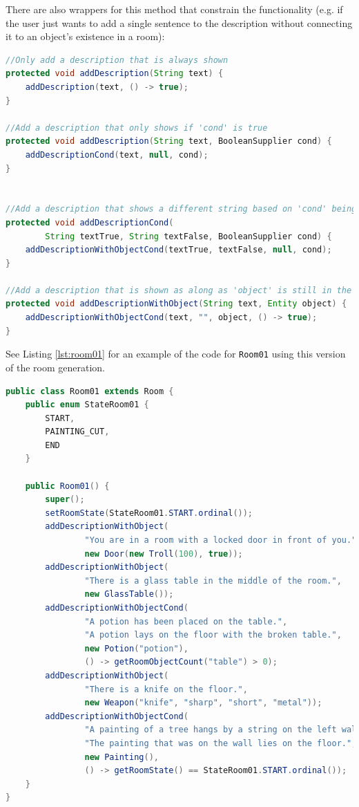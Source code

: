 \documentclass[11pt]{article}
\begin{document}
There are also wrappers for this method that constrain the functionality (e.g. if the user just wants to add a single sentence to the description without connecting it to an object's existence in a room):

\begin{lstlisting}[language=Java, caption=addDescriptionWithObjectCond() wrappers, label=lst:room-description-wrappers]
//Only add a description that is always shown
protected void addDescription(String text) {
    addDescription(text, () -> true);
}

//Add a description that only shows if 'cond' is true
protected void addDescription(String text, BooleanSupplier cond) {
    addDescriptionCond(text, null, cond);
}


//Add a description that shows a different string based on 'cond' being true/false
protected void addDescriptionCond(
        String textTrue, String textFalse, BooleanSupplier cond) {
    addDescriptionWithObjectCond(textTrue, textFalse, null, cond);
}

//Add a description that is shown as along as 'object' is still in the room
protected void addDescriptionWithObject(String text, Entity object) {
    addDescriptionWithObjectCond(text, "", object, () -> true);
}
\end{lstlisting}

See Listing \ref{lst:room01} for an example of the code for \texttt{Room01} using this version of the room generation.

\begin{lstlisting}[language=Java, caption=Room01.java (Version 2), label=lst:room01]
public class Room01 extends Room {
    public enum StateRoom01 {
        START,
        PAINTING_CUT,
        END
    }

    public Room01() {
        super();
        setRoomState(StateRoom01.START.ordinal());
        addDescriptionWithObject(
                "You are in a room with a locked door in front of you.",
                new Door(new Troll(100), true));
        addDescriptionWithObject(
                "There is a glass table in the middle of the room.",
                new GlassTable());
        addDescriptionWithObjectCond(
                "A potion has been placed on the table.",
                "A potion lays on the floor with the broken table.",
                new Potion("potion"),
                () -> getRoomObjectCount("table") > 0);
        addDescriptionWithObject(
                "There is a knife on the floor.",
                new Weapon("knife", "sharp", "short", "metal"));
        addDescriptionWithObjectCond(
                "A painting of a tree hangs by a string on the left wall.",
                "The painting that was on the wall lies on the floor.",
                new Painting(),
                () -> getRoomState() == StateRoom01.START.ordinal());
    }
}
\end{lstlisting}
\end{document}
